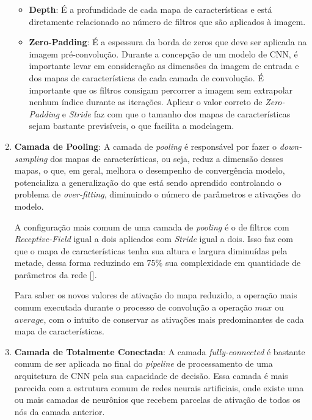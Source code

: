 \begin{enumerate}
\begin{itemize}
                \item \textbf{Depth}: É a profundidade de cada mapa de características e está diretamente relacionado ao número de 
                filtros que são aplicados à imagem.

                \item \textbf{Zero-Padding}: É a espessura da borda de zeros que deve ser aplicada na imagem pré-convolução. Durante a concepção 
                de um modelo de CNN, é importante levar em consideração as dimensões da imagem de entrada e dos mapas de características de cada 
                camada de convolução. É importante que os filtros consigam percorrer a imagem sem extrapolar nenhum índice durante as iterações. 
                Aplicar o valor correto de \textit{Zero-Padding} e \textit{Stride} faz com que o tamanho dos mapas de características sejam bastante 
                previsíveis, o que facilita a modelagem.
            \end{itemize}
            
    \item \textbf{Camada de Pooling}:
            A camada de \textit{pooling} é responsável por fazer o \textit{down-sampling} dos mapas de características, ou seja, reduz a dimensão 
            desses mapas, o que, em geral, melhora o desempenho de convergência modelo, potencializa a generalização do que está sendo aprendido 
            controlando o problema de \textit{over-fitting}, diminuindo o número de parâmetros e ativações do modelo.
            
            A configuração mais comum de uma camada de \textit{pooling} é o de filtros com \textit{Receptive-Field} igual a dois aplicados com 
            \textit{Stride} igual a dois. Isso faz com que o mapa de características tenha sua altura e largura diminuídas pela metade, dessa forma 
            reduzindo em 75\% sua complexidade em quantidade de parâmetros da rede [].
            
            Para saber os novos valores de ativação do mapa reduzido, a operação mais comum executada durante o processo de convolução a operação 
            $max$ ou $average$, com o intuito de conservar as ativações mais predominantes de cada mapa de características.
            
    \item \textbf{Camada de Totalmente Conectada}:
            A camada \textit{fully-connected} é bastante comum de ser aplicada no final do \textit{pipeline} de processamento de uma arquitetura de 
            CNN pela sua capacidade de decisão. Essa camada é mais parecida com a estrutura comum de redes neurais artificiais, onde existe uma ou mais 
            camadas de neurônios que recebem parcelas de ativação de todos os nós da camada anterior.
            

\end{enumerate}

